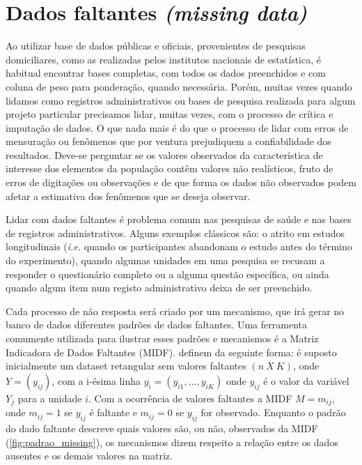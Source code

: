 

\section{Dados faltantes \textit{(missing data)}}

Ao utilizar base de dados públicas e oficiais, provenientes de pesquisas domiciliares, como as realizadas pelos institutos nacionais de estatística, é habitual encontrar bases completas, com todos os dados preenchidos e com coluna de peso para ponderação, quando necessária. Porém, muitas vezes quando lidamos como registros administrativos ou bases de pesquisa realizada para algum projeto particular precisamos lidar, muitas vezes, com o processo de crítica e imputação de dados. O que nada mais é do que o processo de lidar com erros de mensuração ou fenômenos que por ventura prejudiquem a confiabilidade dos resultados. Deve-se perguntar se os valores observados da característica de interesse dos elementos da população contêm valores não realísticos, fruto de erros de digitações ou observações e de que forma os dados não observados podem afetar a estimativa dos fenômenos que se deseja observar.  

Lidar com dados faltantes é problema comum nas pesquisas de saúde e nas bases de registros administrativos. Alguns exemplos clássicos são: o atrito em estudos longitudinais (\textit{i.e.} quando os participantes abandonam o estudo antes do término do experimento), quando algumas unidades em uma pesquisa se recusam a responder o questionário completo ou a alguma questão específica, ou ainda quando algum item num registo administrativo deixa de ser preenchido. 

Cada processo de não resposta será criado por um mecanismo, que irá gerar no banco de dados diferentes padrões de dados faltantes. Uma ferramenta comumente utilizada para ilustrar esses padrões e mecanismos é a Matriz Indicadora de Dados Faltantes (MIDF).  definem da seguinte forma: é suposto inicialmente um dataset retangular sem valores faltantes $(n \ X\ K )$, onde $Y = (y_{ij})$, com a i-ésima linha $y_{i} = (y_{i1},...,y_{iK})$ onde $y_{ij}$ é o valor da variável $Y_{j}$ para a unidade $i$. Com a ocorrência de valores faltantes a MIDF $M=m_{ij}$, onde $m_{ij}=1$ se $y_{ij}$ é faltante e $m_{ij}=0$ se $y_{ij}$ for observado. Enquanto o padrão do dado faltante descreve quais valores são, ou não, observados da MIDF (\ref{fig:padrao_missing}), os mecanismos dizem respeito a relação entre os dados ausentes e os demais valores na matriz. 

